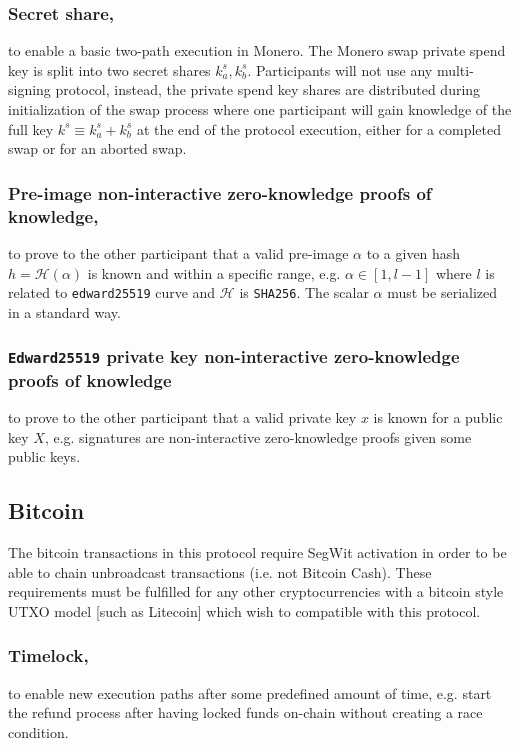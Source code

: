 \documentclass{llncs}
\begin{document}
\subsubsection{Secret share,}
to enable a basic two-path execution in Monero. The Monero swap private spend key is split into two secret shares $k^s_a, k^s_b$. Participants will not use any multi-signing protocol, instead, the private spend key shares are distributed during initialization of the swap process where one participant will gain knowledge of the full key $k^s \equiv k^s_a + k^s_b$ at the end of the protocol execution, either for a completed swap or for an aborted swap.

\subsubsection{Pre-image non-interactive zero-knowledge proofs of knowledge,}
to prove to the other participant that a valid pre-image $\alpha$ to a given hash $h = \mathcal{H}(\alpha)$ is known and within a specific range, e.g. $\alpha \in [1, l-1]$ where $l$ is related to \texttt{edward25519} curve and $\mathcal{H}$ is \texttt{SHA256}. The scalar $\alpha$ must be serialized in a standard way.

\subsubsection{\texttt{Edward25519} private key non-interactive zero-knowledge proofs of knowledge}
to prove to the other participant that a valid private key $x$ is known for a public key $X$, e.g. signatures are non-interactive zero-knowledge proofs given some public keys.

\subsection{Bitcoin}
The bitcoin transactions in this protocol require SegWit activation in order to be able to chain unbroadcast transactions (i.e. not Bitcoin Cash). These requirements must be fulfilled for any other cryptocurrencies with a bitcoin style UTXO model [such as Litecoin] which wish to compatible with this protocol.

\subsubsection{Timelock,}
to enable new execution paths after some predefined amount of time, e.g. start the refund process after having locked funds on-chain without creating a race condition.
\end{document}
